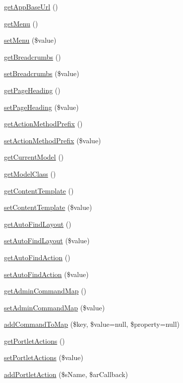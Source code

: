\begin{DoxyCompactItemize}
\item 
\hyperlink{classCXLController_ae32b7248cefed2da5b054c1a4ab674b1}{getAppBaseUrl} ()
\item 
\hyperlink{classCXLController_a637e84e2e9e99a87ea9b5f1771551af4}{getMenu} ()
\item 
\hyperlink{classCXLController_a5cf6c2464263681fdc1186bb94ee9ad8}{setMenu} (\$value)
\item 
\hyperlink{classCXLController_ab53bf1b4b27392839a16ecf3ad62e88b}{getBreadcrumbs} ()
\item 
\hyperlink{classCXLController_a9f9822dfb5d491a6e0b9c836d6ce4e3f}{setBreadcrumbs} (\$value)
\item 
\hyperlink{classCXLController_af6a608839df34306457a0f877695bce0}{getPageHeading} ()
\item 
\hyperlink{classCXLController_aee7c1dbb383543b39ff09bf25dc6adf0}{setPageHeading} (\$value)
\item 
\hyperlink{classCXLController_af06d6acbc7631d7109d3281191b33bc9}{getActionMethodPrefix} ()
\item 
\hyperlink{classCXLController_acfc34f281282bbec29fe66ca52419651}{setActionMethodPrefix} (\$value)
\item 
\hyperlink{classCXLController_a71e9b2625e1f13a65ea101b53d2f264d}{getCurrentModel} ()
\item 
\hyperlink{classCXLController_aef6109e8c58719533639e6526717fb1b}{getModelClass} ()
\item 
\hyperlink{classCXLController_a68388edace82b8984b694c1d4e6beb82}{getContentTemplate} ()
\item 
\hyperlink{classCXLController_a5166a144947cae70bcb6ad5b508cefcc}{setContentTemplate} (\$value)
\item 
\hyperlink{classCXLController_a9a7643aeb71f6ca0cdfd394f9bd7deda}{getAutoFindLayout} ()
\item 
\hyperlink{classCXLController_a39204785aa23a9a43f8a6e1bb3998efb}{setAutoFindLayout} (\$value)
\item 
\hyperlink{classCXLController_aee02b55545c3a77d1bf4b3480856e774}{getAutoFindAction} ()
\item 
\hyperlink{classCXLController_a8f4e999ffe16e8a84221c6e0de6f7bd9}{setAutoFindAction} (\$value)
\item 
\hyperlink{classCXLController_aa02a564e1ffff40fd78f509309154d95}{getAdminCommandMap} ()
\item 
\hyperlink{classCXLController_a23588c95ee01933abc6e0590c1aa1138}{setAdminCommandMap} (\$value)
\item 
\hyperlink{classCXLController_ad7fa598cf33ccbba931578de18f074bf}{addCommandToMap} (\$key, \$value=null, \$property=null)
\item 
\hyperlink{classCXLController_ae3e26353e430eb74e086211a9bfcb957}{getPortletActions} ()
\item 
\hyperlink{classCXLController_a62630bbea4f9a6d711684891ad307fda}{setPortletActions} (\$value)
\item 
\hyperlink{classCXLController_a1103c34c21ad3fac33acc05c977edd46}{addPortletAction} (\$sName, \$arCallback)
\end{DoxyCompactItemize}
